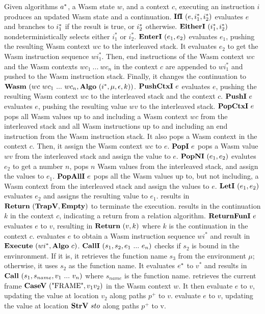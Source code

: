 Given algorithms $a^*$, a Wasm state $w$, and a context $c$, executing an
instruction $i$ produces an updated Wasm state and a continuation.
$\textbf{IfI} ~ (e, i_1^*, i_2^*)${} evaluates $e$ and branches to $i^*_1$ if the
result is true, or $i^*_2$ otherwise.
$\textbf{EitherI} ~ (i_1^*, i_2^*)${} nondeterministically selects either $i_1^*$ or
$i_2^*$.
$\textbf{EnterI} ~ (e_1, e_2)${} evaluates $e_1$, pushing the resulting Wasm context
$wc$ to the interleaved stack.
It evaluates $e_2$ to get the Wasm instruction sequence $wi_1^*$.
Then, end instructions of the Wasm context $wc$ and the Wasm contexts
$wc_1 ~ ... ~ wc_n$ in the context $c$ are appended to $wi_1^*$ and pushed to
the Wasm instruction stack.
Finally, it changes the continuation to
$\textbf{Wasm} ~ (wc ~ wc_1 ~ ... ~ wc_n, \textbf{Algo} ~ (i^*, \mu, \epsilon, k))${}.
$\textbf{PushCtxI} ~ e${} evaluates $e$, pushing the resulting Wasm context $wc$ to the
interleaved stack and the context $c$.
$\textbf{PushI} ~ e${} evaluates $e$, pushing the resulting value $wv$ to the
interleaved stack.
$\textbf{PopCtxI} ~ e${} pops all Wasm values up to and including a Wasm context $wc$
from the interleaved stack and all Wasm instructions up to and including an end
instruction from the Wasm instruction stack.
It also pops a Wasm context in the context $c$.
Then, it assign the Wasm context $wc$ to $e$.
$\textbf{PopI} ~ e${} pops a Wasm value $wv$ from the interleaved stack and assign the
value to $e$.
$\textbf{PopNI} ~ (e_1, e_2)${} evalutes $e_2$ to get a number $n$, pops $n$ Wasm
values from the interleaved stack, and assign the values to $e_1$.
$\textbf{PopAllI} ~ e${} pops all the Wasm values up to, but not including, a
Wasm context from the interleaved stack and assign the values to $e$.
$\textbf{LetI} ~ (e_1, e_2)${} evaluates $e_2$ and assigns the resulting value to
$e_1$.
\trapi{} results in $\textbf{Return} ~ (\textbf{TrapV}{}, \textbf{Empty}{})$ to terminate the execution.
\returnreli{} results in the continuation $k$ in the context $c$, indicating a
return from a relation algorithm.
$\textbf{ReturnFunI} ~ e${} evaluates $e$ to $v$, resulting in $\textbf{Return} ~ (v, k)${} where
$k$ is the continuation in the context $c$.
\executei{} evaluates $e$ to obtain a Wasm instruction sequence $wi^*$ and
result in $\textbf{Execute} ~ (wi^*, \textbf{Algo} ~ c)${}.
$\textbf{CallI} ~ (s_1, s_2, e_1 ~ ... ~ e_n)${} checks if $s_2$ is bound in the
envinronment.
If it is, it retrieves the function name $s_3$ from the environment $\mu$;
otherwise, it uses $s_2$ as the function name.
It evaluates $e^*$ to $v^*$ and results in $\textbf{Call} ~ (s_1, s_{name}, v_1 ~ ...
~ v_n)${} where $s_{name}$ is the function name.
\replaceframei{} retrieves the current frame $\textbf{CaseV} ~ (\text{"FRAME"}, v_1
v_2)${} in the Wasm context $w$.
It then evaluate $e$ to $v$, updating the value at location $v_2$ along paths
$p^+$ to $v$.
\replacestorei{} evaluate $e$ to $v$, updating the value at location $\textbf{StrV} ~
sto$ along paths $p^+$ to v.




